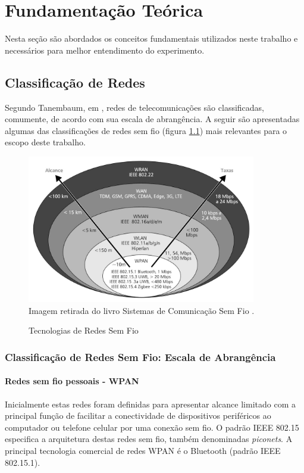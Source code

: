 \chapter{Fundamentação Teórica}
\label{fundamentacao}
Nesta seção são abordados os conceitos fundamentais utilizados neste trabalho e necessários para melhor entendimento do experimento.

\section{Classificação de Redes}
\label{classRedes}
Segundo Tanembaum, em \cite{tanembaum2011}, redes de telecomunicações são classificadas, comumente, de acordo com sua escala de abrangência. A seguir são apresentadas algumas das classificações de redes sem fio (figura \ref{fig:tecnologias_redes_semfiof}) mais relevantes para o escopo deste trabalho.

\begin{figure}[ht]
      \begin{center}
            \caption{Tecnologias de Redes Sem Fio}
            \includegraphics[width=10cm]{./sections/textual/chapters/images/tecnologias_redes_semfio.png}\\
            Imagem retirada do livro Sistemas de Comunicação Sem Fio \cite{rochol2018sistemas}.
            \label{fig:tecnologias_redes_semfiof}
      \end{center}
\end{figure}

\subsection{Classificação de Redes Sem Fio: Escala de Abrangência}
\subsubsection*{Redes sem fio pessoais - WPAN}
Inicialmente estas redes foram definidas para apresentar alcance limitado com a principal função de facilitar a conectividade de dispositivos periféricos ao computador ou telefone celular por uma conexão sem fio. O padrão IEEE 802.15 especifica a arquitetura destas redes sem fio, também denominadas \emph{piconets}. A principal  tecnologia comercial de redes WPAN é o Bluetooth (padrão IEEE 802.15.1).

